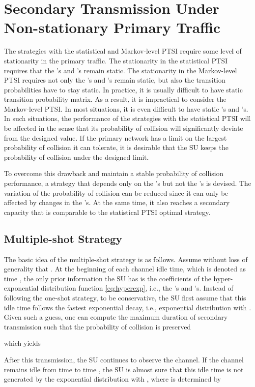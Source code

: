 \documentclass[10pt,final,journal,letterpaper]{IEEEtran}
\begin{document}
\section{Secondary Transmission Under Non-stationary Primary Traffic}\label{sec:5}
The strategies with the statistical and Markov-level PTSI require some level of stationarity in the primary traffic. The stationarity in the statistical PTSI requires that the 's and 's remain static. The stationarity in the Markov-level PTSI requires not only the 's and 's remain static, but also the transition probabilities have to stay static. In practice, it is usually difficult to have static transition probability matrix. As a result, it is impractical to consider the Markov-level PTSI. In most situations, it is even difficult to have static 's and 's. In such situations, the performance of the strategies with the statistical PTSI will be affected in the sense that its probability of collision will significantly deviate from the designed value. If the primary network has a limit on the largest probability of collision it can tolerate, it is desirable that the SU keeps the probability of collision under the designed limit.

To overcome this drawback and maintain a stable probability of collision performance, a strategy that depends only on the 's but not the 's is devised. The variation of the probability of collision can be reduced since it can only be affected by changes in the 's. At the same time, it also reaches a secondary capacity that is comparable to the statistical PTSI optimal strategy.

\subsection{Multiple-shot Strategy}
The basic idea of the multiple-shot strategy is as follows. Assume without loss of generality that . At the beginning of each channel idle time, which is denoted as time , the only prior information the SU has is the coefficients of the hyper-exponential distribution function \eqref{eq:hyperexp}, i.e., the 's and 's. Instead of following the one-shot strategy, to be conservative, the SU first assume that this idle time follows the fastest exponential decay, i.e., exponential distribution with . Given such a guess, one can compute the maximum duration of secondary transmission  such that the probability of collision is preserved

which yields

After this transmission, the SU continues to observe the channel. If the channel remains idle from time  to time , the SU is almost sure that this idle time is not generated by the exponential distribution with , where  is determined by
\end{document}
